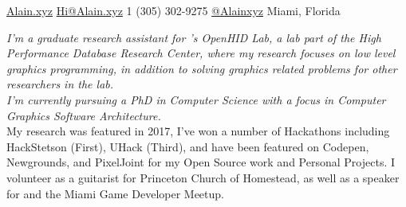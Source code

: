 \documentclass[10pt,a4paper]{article}
\begin{document}
 

\noindent \href{https://alain.xyz}{Alain.xyz} \bull \href{mailto:hi@Alain.xyz}{Hi@Alain.xyz} \bull
\textsmaller{+}1 (305) 302-9275 \bull \href{https://twitter.com/Alainxyz}{@Alainxyz} \bull Miami, Florida

\spacedhrule{0.9em}{-0.4em}



\vspace{-1.3em}

\begin{multicols}{2}
\noindent \textit{I'm a graduate research assistant for 's OpenHID Lab, a  lab part of the High Performance Database Research Center, where my research focuses on low level graphics programming, in addition to solving graphics related problems for other researchers in the lab. \\ I'm currently pursuing a PhD in Computer Science with a focus in Computer Graphics Software Architecture.} \\

My research was featured in  2017, I've won a number of Hackathons including HackStetson (First), UHack (Third), and have been featured on Codepen, Newgrounds, and PixelJoint for my Open Source work and Personal Projects. I volunteer as a guitarist for Princeton Church of Homestead, as well as a speaker for  and the Miami Game Developer Meetup.
\end{multicols}
\end{document}
